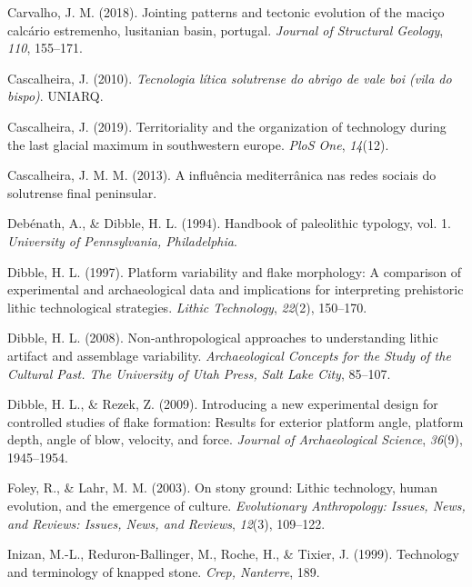 \documentclass[12pt,twoside]{reedthesis}
\begin{document}
\leavevmode\hypertarget{ref-carvalho2018}{}%
Carvalho, J. M. (2018). Jointing patterns and tectonic evolution of the maciço calcário estremenho, lusitanian basin, portugal. \emph{Journal of Structural Geology}, \emph{110}, 155--171.

\leavevmode\hypertarget{ref-cascalheira2010}{}%
Cascalheira, J. (2010). \emph{Tecnologia lítica solutrense do abrigo de vale boi (vila do bispo)}. UNIARQ.

\leavevmode\hypertarget{ref-cascalheira2019}{}%
Cascalheira, J. (2019). Territoriality and the organization of technology during the last glacial maximum in southwestern europe. \emph{PloS One}, \emph{14}(12).

\leavevmode\hypertarget{ref-cascalheira2013}{}%
Cascalheira, J. M. M. (2013). A influência mediterrânica nas redes sociais do solutrense final peninsular.

\leavevmode\hypertarget{ref-debenath1994}{}%
Debénath, A., \& Dibble, H. L. (1994). Handbook of paleolithic typology, vol. 1. \emph{University of Pennsylvania, Philadelphia}.

\leavevmode\hypertarget{ref-dibble1997}{}%
Dibble, H. L. (1997). Platform variability and flake morphology: A comparison of experimental and archaeological data and implications for interpreting prehistoric lithic technological strategies. \emph{Lithic Technology}, \emph{22}(2), 150--170.

\leavevmode\hypertarget{ref-dibble2008}{}%
Dibble, H. L. (2008). Non-anthropological approaches to understanding lithic artifact and assemblage variability. \emph{Archaeological Concepts for the Study of the Cultural Past. The University of Utah Press, Salt Lake City}, 85--107.

\leavevmode\hypertarget{ref-dibble2009}{}%
Dibble, H. L., \& Rezek, Z. (2009). Introducing a new experimental design for controlled studies of flake formation: Results for exterior platform angle, platform depth, angle of blow, velocity, and force. \emph{Journal of Archaeological Science}, \emph{36}(9), 1945--1954.

\leavevmode\hypertarget{ref-foley2003}{}%
Foley, R., \& Lahr, M. M. (2003). On stony ground: Lithic technology, human evolution, and the emergence of culture. \emph{Evolutionary Anthropology: Issues, News, and Reviews: Issues, News, and Reviews}, \emph{12}(3), 109--122.

\leavevmode\hypertarget{ref-inizan1999}{}%
Inizan, M.-L., Reduron-Ballinger, M., Roche, H., \& Tixier, J. (1999). Technology and terminology of knapped stone. \emph{Crep, Nanterre}, 189.
\end{document}
